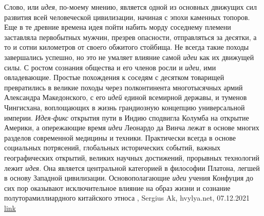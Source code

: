 Слово, или \emph{идея}, по-моему мнению, является одной из основных движущих сил
развития всей человеческой цивилизации, начиная с эпохи каменных топоров. Еще в
те древние времена идея пойти набить морду соседнему племени заставляла
первобытных мужчин, презрев опасности, отправляться за десятки, а то и сотни
километров от своего обжитого стойбища. Не всегда такие походы завершались
успешно, но это не умаляет влияние самой \emph{идеи} как их движущей силы. С ростом
сознания общества и его членов росли и \emph{идеи}, ими овладевающие. Простые
похождения к соседям с десятком товарищей превратились в великие походы через
полконтинента многотысячных армий Александра Македонского, с его \emph{идей} единой
всемирной державы, и туменов Чингисхана, воплощающих в жизнь грандиозную
концепцию универсальной империи. \emph{Идея-фикс} открытия пути в Индию сподвигла
Колумба на открытие Америки, а опережающие время \emph{идеи} Леонардо да Винча лежат в
основе многих разделов современной медицины и техники.
Практически всегда в основе социальных потрясений, глобальных исторических
событий, важных географических открытий, великих научных достижений, прорывных
технологий лежит \emph{идея}. Она является центральной категорией в философии Платона,
легшей в основу Западной цивилизации. Основополагающие \emph{идеи} учения Конфуция до
сих пор оказывают исключительное влияние на образ жизни и сознание
полуторамиллиардного китайского этноса
, 
Sergius Ak, hvylya.net, 07.12.2021
\href{https://hvylya.net/analytics/243091-ukraina-posle-zelenskogo}{link}
